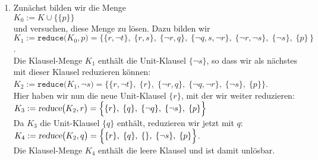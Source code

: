 \begin{enumerate}
\item Zunächst bilden wir die Menge \\[0.2cm]
      \hspace*{1.3cm} $K_0 := K \cup \bigl\{ \{p\} \bigr\}$       \\[0.2cm]
      und versuchen, diese Menge zu lösen.  Dazu bilden wir \\[0.2cm]
      \hspace*{0.3cm} 
      $K_1 := \texttt{reduce}\bigl(K_0,p\bigr) = 
          \Big\{ \{r, \neg t\},\; \{r, s\},\; \{\neg r, q\},\; \{\neg q, s, \neg r\},\; \{\neg r, \neg s\},\; \{ \neg s\},\;\{p\}\, \Big\}$.
      \\[0.2cm]
      Die Klausel-Menge $K_1$ enthält die Unit-Klausel $\{\neg s\}$,
      so dass wir als nächstes mit dieser Klausel reduzieren können: \\[0.2cm]
      \hspace*{1.3cm} 
      $K_2 := \texttt{reduce}\bigl(K_1,\neg s\bigr) = 
              \Big\{ \{r, \neg t\},\; \{r\},\; \{\neg r, q\},\; \{\neg q, \neg r\},\; \{ \neg s\},\; \{p\} \Big\}$.
      \\[0.2cm]
      Hier haben wir nun die neue Unit-Klausel $\{r\}$, mit der wir weiter reduzieren:
      \\[0.2cm]
      \hspace*{1.3cm} 
      $K_3 := \textsl{reduce}\bigl(K_2, r\bigr) = 
              \Big\{ \{r\},\; \{q\},\; \{\neg q\},\; \{ \neg s\},\; \{p\} \Big\}$
      \\[0.2cm]
      Da $K_3$ die Unit-Klausel $\{q\}$ enthält, reduzieren wir jetzt mit $q$: \\[0.2cm]
      \hspace*{1.3cm} 
      $K_4 := \textsl{reduce}\bigl(K_2, q\bigr) = 
              \Big\{ \{r\},\; \{q\},\; \{\},\; \{ \neg s\},\; \{p\} \Big\}$.
      \\[0.2cm]
      Die Klausel-Menge $K_4$ enthält die leere Klausel und ist damit unlösbar.
     

\end{enumerate}
